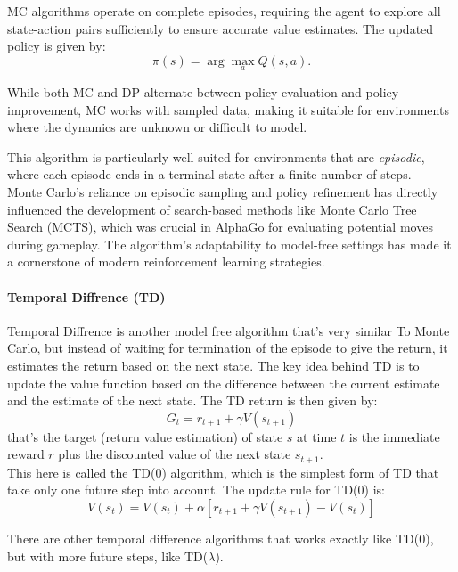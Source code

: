MC algorithms operate on complete episodes, requiring the agent to explore all
state-action pairs sufficiently to ensure accurate value estimates. The updated
policy is given by:
\begin{equation}
    \pi(s) = \arg\max_a Q(s, a).
\end{equation}

While both MC and DP alternate between policy evaluation and policy
improvement, MC works with sampled data, making it suitable for environments
where the dynamics are unknown or difficult to model.

This algorithm is particularly well-suited for environments that are
\emph{episodic}, where each episode ends in a terminal state after a finite
number of steps. \\ Monte Carlo's reliance on episodic sampling and policy
refinement has directly influenced the development of search-based methods like
Monte Carlo Tree Search (MCTS), which was crucial in AlphaGo for evaluating
potential moves during gameplay. The algorithm's adaptability to model-free
settings has made it a cornerstone of modern reinforcement learning strategies.

\paragraph{Temporal Diffrence (TD)}

Temporal Diffrence is another model free algorithm that's very similar To Monte
Carlo, but instead of waiting for termination of the episode to give the
return, it estimates the return based on the next state. The key idea behind TD
is to update the value function based on the difference between the current
estimate and the estimate of the next state. The TD return is then given by:
\begin{equation}
    G_t = r_{t+1} + \gamma V(s_{t+1})
\end{equation}
that's the target (return value estimation) of state $s$ at time $t$ is the immediate reward $r$ plus the
discounted value of the next state $s_{t+1}$.\\
This here is called the TD(0) algorithm, which is the simplest form of TD
that take only one future step into account. The update rule for TD(0) is:
\begin{equation}
    V(s_t) = V(s_t) + \alpha [r_{t+1} + \gamma V(s_{t+1}) - V(s_t)]
\end{equation}

There are other temporal difference algorithms that works exactly like TD(0),
but with more future steps, like TD($\lambda$). \\

